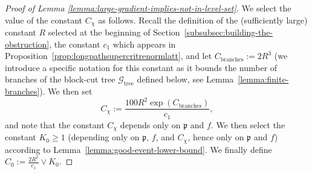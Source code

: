 \documentclass[12pt]{amsart}
\numberwithin{equation}{section}
\begin{document}
\begin{proof}[Proof of Lemma \ref{lemma:large-gradient-implies-not-in-level-set}]
		
		We select the value of the constant $C_\chi$ as follows. Recall the definition of the (sufficiently large) constant $R$ selected at the beginning of Section~\ref{subsubsec:building-the-obstruction}, the constant $c_1$ which appears in Proposition~\ref{prop:longpathsupercritrenormlatt}, and let $C_{\mathrm{branches}} := 2R^3$ (we introduce a specific notation for this constant as it bounds the number of branches of the block-cut tree $\mathcal{G}_{\mathrm{tree}}$ defined below, see Lemma~\ref{lemma:finite-branches}). We then set
		\begin{equation*}
			C_\chi := \frac{100 R^2 \exp \left( C_{\mathrm{branches}} \right)}{c_1},
		\end{equation*}
		and note that the constant $C_\chi$ depends only on $\mathfrak{p}$ and $f$.
		We then select the constant $K_0 \geq 1$ (depending only on $\mathfrak{p}$, $f$, and $C_\chi$, hence only on $\mathfrak{p}$ and $f$) according to Lemma~\ref{lemma:good-event-lower-bound}. We finally define $C_0 := \frac{2 R^2}{c_1} \vee K_0$.
		

\end{proof}
\end{document}
